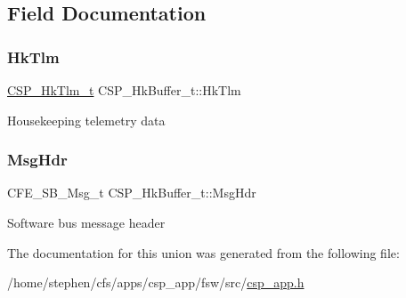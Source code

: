 \subsection{Field Documentation}
\mbox{\label{unionCSP__HkBuffer__t_a13efbc08e5a9383cbc2cc5206fcbc5d6}} 
\subsubsection{\texorpdfstring{Hk\+Tlm}{HkTlm}}
{\footnotesize\ttfamily \hyperlink{structCSP__HkTlm__t}{C\+S\+P\+\_\+\+Hk\+Tlm\+\_\+t} C\+S\+P\+\_\+\+Hk\+Buffer\+\_\+t\+::\+Hk\+Tlm}

Housekeeping telemetry data \mbox{\label{unionCSP__HkBuffer__t_ab06dc89ee8d1c682765ee2907ae33419}} 
\subsubsection{\texorpdfstring{Msg\+Hdr}{MsgHdr}}
{\footnotesize\ttfamily C\+F\+E\+\_\+\+S\+B\+\_\+\+Msg\+\_\+t C\+S\+P\+\_\+\+Hk\+Buffer\+\_\+t\+::\+Msg\+Hdr}

Software bus message header 

The documentation for this union was generated from the following file\+:\begin{DoxyCompactItemize}
\item 
/home/stephen/cfs/apps/csp\+\_\+app/fsw/src/\hyperlink{csp__app_8h}{csp\+\_\+app.\+h}\end{DoxyCompactItemize}
